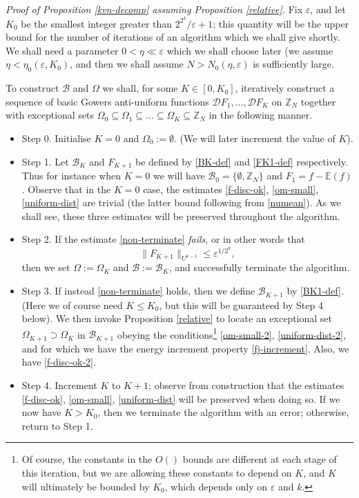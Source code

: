 \documentclass[12pt,a4paper,reqno]{amsart}
\numberwithin{equation}{section}
\theoremstyle{plain}
\theoremstyle{definition}
\renewcommand{\leq}{\leqslant}
\def\B{{\mathcal B}}
\def\D{{\mathcal D}}
\def\Z{{\mathbb Z}}
\def\E{{\mathbb E}}
\def\eps{{\varepsilon}}
\def\vs{\vspace{11pt}}
\def\ni{\noindent}
\def\emph#1{{\it #1}}
\begin{document}
\ni\textit{Proof of Proposition \ref{kvn-decomp} assuming Proposition \ref{relative}.}
Fix $\eps$, and let $K_0$ be the smallest integer greater than $2^{2^k}/\eps+1$; this quantity will be the upper bound for the number of iterations of an algorithm which we shall give shortly.  
We shall need a parameter $0 < \eta \ll \eps$ which we shall choose 
later (we assume $\eta < \eta_0(\eps, K_0)$, and then we shall assume $N > N_0(\eta,\eps)$ is sufficiently large.\vs

\ni To construct $\B$ and $\Omega$ we shall, for some $K \in [0,K_0]$, iteratively construct a sequence of basic Gowers anti-uniform
functions $\D F_1, \ldots, \D F_K$ on $\mathbb{Z}_N$ together with 
exceptional sets $\Omega_0 \subseteq\Omega_1 \subseteq\ldots \subseteq\Omega_K \subseteq\mathbb{Z}_N$ in the following manner.
\begin{itemize}

\item Step 0.  Initialise $K = 0$ and $\Omega_0 := \emptyset$.  (We will later increment the value of $K$).
\item Step 1.  Let $\B_K$ and $F_{K+1}$ be defined by \eqref{BK-def} and \eqref{FK1-def} respectively.  Thus for instance when $K=0$
we will have $\B_0 = \{\emptyset,\Z_N\}$ and $F_1 = f - \E(f)$.  Observe that in the $K=0$ case, the estimates \eqref{f-disc-ok}, \eqref{om-small}, \eqref{uniform-dist} are trivial (the latter bound following from \eqref{numean}).  As we shall see, these three 
estimates will be preserved throughout the algorithm.
\item Step 2.  If the estimate \eqref{non-terminate} \emph{fails}, or in other words that
$$ \| F_{K+1} \|_{U^{k-1}} \leq \eps^{1/2^k},$$
then we set $\Omega := \Omega_K$ and $\B := \B_K$, and successfully terminate the algorithm.
\item Step 3.  If instead \eqref{non-terminate} holds, then we define $\B_{K+1}$ by \eqref{BK1-def}.  (Here we of course need $K \leq K_0$, but
this will be guaranteed by Step 4 below).  We then invoke Proposition \ref{relative} to locate an exceptional 
set $\Omega_{K+1} \supset \Omega_K$ in $\B_{K+1}$ obeying the conditions\footnote{Of course, the constants in the $O()$ bounds are different at each stage of this iteration, but we are allowing these constants to depend on $K$, and $K$ will ultimately be bounded by $K_0$, which depends only on $\eps$ and $k$.} \eqref{om-small-2}, \eqref{uniform-dist-2}, and for which
we have the energy increment property \eqref{fj-increment}.  Also, we have \eqref{f-disc-ok-2}.
\item Step 4.  Increment $K$ to $K+1$; observe from construction that the estimates \eqref{f-disc-ok}, \eqref{om-small}, \eqref{uniform-dist} will be preserved when doing so.  If we now have $K > K_0$, then we terminate the algorithm with an error; otherwise, return to Step 1.

\end{itemize}
\end{document}
